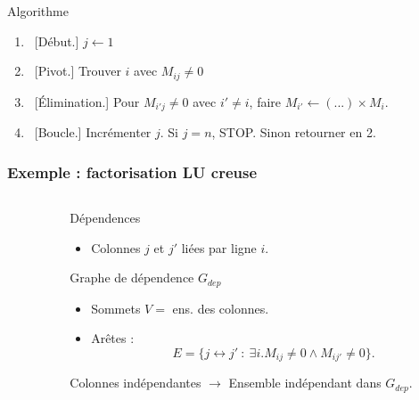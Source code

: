 \documentclass[xcolor={x11names,svgnames}]{beamer}
\begin{document}
\begin{frame}[label=sparse_lu_example]
\begin{block}{Algorithme}
  \setlength{\leftmargini}{5mm}
  \begin{enumerate}
  \item~[Début.] $j \gets 1$
  \item~[Pivot.] Trouver $i$ avec $M_{ij} \neq 0$
  \item~[Élimination.] Pour $M_{i'j} \neq 0$ avec $i' \neq i$, faire $M_{i'} \gets (...) \times M_i$.
  \item~[Boucle.] Incrémenter $j$. Si $j=n$, STOP. Sinon retourner en 2.
  \end{enumerate}
\end{block}
\end{frame}


\begin{frame}[label=sparse_lu_MIS]
  \frametitle{Exemple : factorisation LU creuse}

  \begin{columns}
    \begin{column}{0.4\textwidth}
  
\end{column}
\begin{column}{0.6\textwidth}
  \begin{alertblock}{Dépendences}
    \begin{itemize}
    \item Colonnes $j$ et $j'$ liées par ligne $i$.
    \end{itemize}
  \end{alertblock}

  \medskip

  \begin{block}{Graphe de dépendence $G_{dep}$}
    \begin{itemize}
    \item Sommets $V = $ ens. des colonnes.
    \item Arêtes :
      \[
        E = \{ j \leftrightarrow j'~:~ \exists i. M_{ij} \neq 0 \wedge M_{ij'} \neq 0 \}.
      \]
    \end{itemize}
  \end{block}

  \begin{exampleblock}{Colonnes indépendantes}
    $\rightarrow$ Ensemble indépendant dans $G_{dep}$.
  \end{exampleblock}
\end{column}
\end{columns}
\end{frame}
\end{document}
